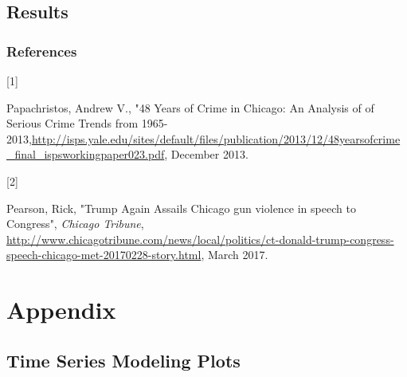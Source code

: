 \documentclass{article} %
\begin{document}
\subsection{Results}

\newpage


\subsubsection*{References}


\hypertarget{Ref1}{[1]} Papachristos, Andrew V., "48 Years of Crime in Chicago: An Analysis of of Serious Crime Trends from 1965-2013,\url{http://isps.yale.edu/sites/default/files/publication/2013/12/48yearsofcrime_final_ispsworkingpaper023.pdf}, December 2013.

\hypertarget{Ref2}{[2]} Pearson, Rick, "Trump Again Assails Chicago gun violence in speech to Congress", \textit{Chicago Tribune}, \url{http://www.chicagotribune.com/news/local/politics/ct-donald-trump-congress-speech-chicago-met-20170228-story.html}, March 2017.


\clearpage
\newpage

\section{Appendix}
\label{headings}


\subsection{Time Series Modeling Plots}
\label{appendix_regression}
\end{document}
